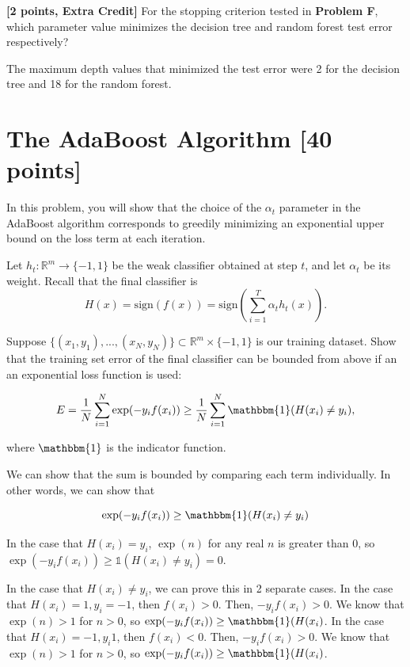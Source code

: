 \problem\textbf{[2 points, Extra Credit] }For the stopping criterion tested in \textbf{Problem F}, which parameter value minimizes the decision tree and random forest test error respectively? 

\begin{solution}
   The maximum depth values that minimized the test error were 2 for the decision tree and 18 for the random forest.
\end{solution}



\newpage
\section{The AdaBoost Algorithm [40 points]}

In this problem, you will show that the choice of the $\alpha_t$ parameter in
the AdaBoost algorithm corresponds to greedily minimizing an exponential upper
bound on the loss term at each iteration.

\problem[3]
Let $h_t: \mathbb{R}^m \rightarrow \{-1,1\}$ be the weak classifier obtained at step $t$, and let $\alpha_t$ be
its weight. Recall that the final classifier is $$H(x) = \text{sign}(f(x)) = \text{sign} \left(\sum\limits_{i=1}^T \alpha_{t}h_t(x) \right).$$

Suppose $\{(x_1, y_1), ..., (x_N, y_N)\} \subset \mathbb{R}^m \times \{-1,1\}$ is our training dataset.  Show that the training set error of the final classifier can be bounded from
above if an an exponential loss function is used:

$$E = \frac{1}{N} \sum\limits_{i=1}^N \exp(-y_{i}f(x_i)) \geq \frac{1}{N} \sum\limits_{i=1}^N \mathbbm{1}(H(x_i) \neq y_i),$$

where $\mathbbm{1}$ is the indicator function.

\begin{solution}
    We can show that the sum is bounded by comparing each term individually. In other words, we can show that

    \[
        \exp(-y_i f(x_i)) \geq \mathbbm{1}(H(x_i) \neq y_i)
    \]

    In the case that $H(x_i) = y_i$, $\exp(n)$ for any real $n$ is greater than 0, so $\exp(-y_i f(x_i)) \geq \mathbb{1}(H(x_i) \neq y_i) = 0$.

    In the case that $H(x_i) \neq y_i$, we can prove this in 2 separate cases. In the case that $H(x_i) = 1, y_i = -1$, then $f(x_i) > 0$. Then, $-y_i f(x_i) > 0$. We know that $\exp(n) > 1$ for $n > 0$, so $\exp(-y_i f(x_i)) \geq \mathbbm{1}(H(x_i)$. In the case that $H(x_i) = -1, y_i 1$, then $f(x_i) < 0$. Then, $-y_i f(x_i) > 0$. We know that $\exp(n) > 1$ for $n > 0$, so $\exp(-y_i f(x_i)) \geq \mathbbm{1}(H(x_i)$.
\end{solution}

